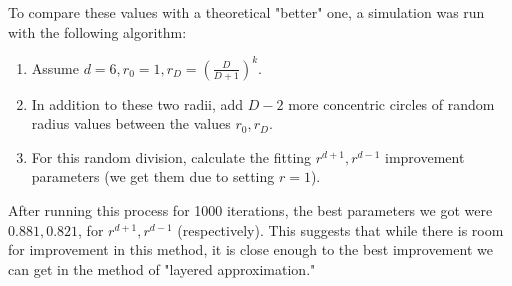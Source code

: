  To compare these values with a theoretical "better" one, a simulation was run with the following algorithm: 
\begin{enumerate}
    \item Assume $d=6,r_0=1, r_D=\left(\frac{D}{D+1}\right)^{k}$.
    \item In addition to these two radii, add $D-2$ more concentric circles of random radius values between the values $r_0, r_D$.
    \item For this random division, calculate the fitting $r^{d+1},r^{d-1}$ improvement parameters (we get them due to setting $r=1$).
\end{enumerate}
After running this process for 1000 iterations, the best parameters we got were $0.881, 0.821$, for $r^{d+1},r^{d-1}$ (respectively). This suggests that while there is room for improvement in this method, it is close enough to the best improvement we can get in the method of "layered approximation."


